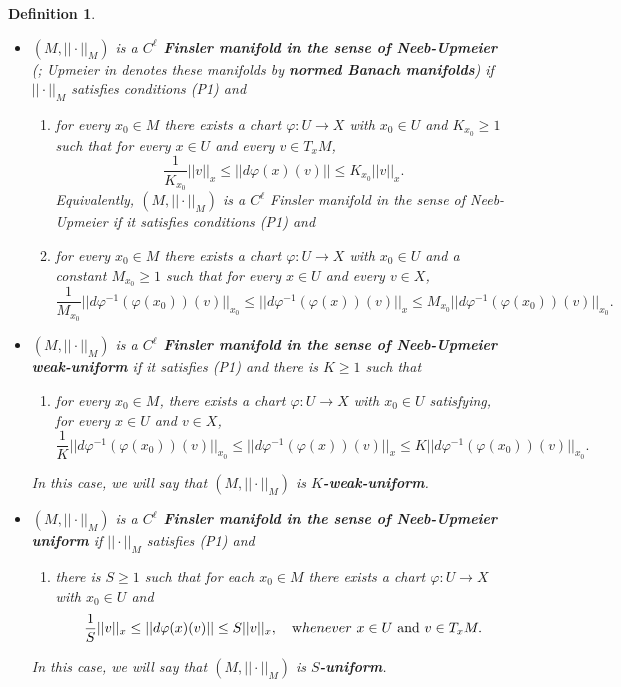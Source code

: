 \documentclass[11pt]{amsart}
\newtheorem{defn}[thm]{Definition}
\numberwithin{equation}{section}
\begin{document}
\begin{defn}
\begin{itemize}
\item[{\bf (F2)}]  $(M,||\cdot||_M)$ is a \textbf{$C^\ell$ Finsler manifold in the sense of Neeb-Upmeier} (\cite{Neeb}; Upmeier in \cite{Upmeier} denotes these manifolds by  {\bf {\em normed Banach manifolds}}) if $||\cdot||_M$  satisfies   conditions {\em (P1)} and
\begin{enumerate}
\item[(NU1)] for every $x_0\in M$ there exists a chart $\varphi:U\to X$ with $x_0\in U$ and $K_{x_0}\ge 1$ such that for every $x\in U$ and every $v\in T_x M$,
\begin{equation}\label{ineq-Neeb-Upmeier}
\frac{1}{K_{x_0}}||v||_x\le ||d\varphi(x)(v)||\le K_{x_0}||v||_x.
\end{equation}
 Equivalently,  $(M,||\cdot||_M)$ is a $C^\ell$ Finsler manifold in the sense of Neeb-Upmeier if it satisfies conditions {\em (P1)} and
\item[(NU2)]  for every $x_0\in M$ there exists a  chart $\varphi:U\to X$ with $x_0\in U$
and a constant $M_{x_0}\ge 1$ such that for every $x\in U$ and every $v\in X$,
 \begin{equation*}
\frac{1}{M_{x_0}}||d\varphi^{-1}(\varphi(x_0))(v)||_{x_0}\le ||d\varphi^{-1}(\varphi(x))(v)||_{x}\le M_{x_0}||d\varphi^{-1}(\varphi(x_0))(v)||_{x_0}.
\end{equation*}
\end{enumerate}

\item[{\bf (F3)}] $(M,||\cdot||_M)$   is a \textbf{ $C^\ell$ Finsler manifold  in the sense of  Neeb-Upmeier   weak-uniform} if it satisfies {\em (P1)} and there is $K\ge 1$ such that
\begin{enumerate}
\item[(NU3)]  for every $x_0\in M$, there exists a chart $\varphi:U\to X$ with $x_0\in U$ satisfying, for every $x\in U$ and $v\in  X$,
\begin{equation} \label{ineq-K-weak-uniform}
\frac{1}{K}||d\varphi^{-1}(\varphi(x_0))(v)||_{x_0}\le ||d\varphi^{-1}(\varphi(x))(v)||_{x}\le K||d\varphi^{-1}(\varphi(x_0))(v)||_{x_0}.
\end{equation}
\end{enumerate}
In this case, we will say that $(M,|| \cdot ||_M)$ is \textbf{ $K$-weak-uniform}.

\item[{\bf (F4)}]  $(M,||\cdot||_M)$ is a  \textbf{ $C^\ell$ Finsler manifold in the sense of  Neeb-Upmeier uniform} if $||\cdot||_M$  satisfies {\em (P1)} and
\begin{enumerate}
\item[(NU4)] there is $S\ge 1$ such that for each $x_0\in M$ there exists a chart $\varphi:U\to X$ with $x_0\in U$ and
\begin{equation}\label{ineq-S-uniform}
\frac{1}{S}||v||_x\le ||d\varphi(x)(v)||\le S||v||_x, \quad {\text whenever \ } x\in U
\text{ and } v\in T_x M.
\end{equation}
\end{enumerate}
In this case, we will say that $(M,|| \cdot ||_M)$ is  \textbf{ $S$-uniform}.
\end{itemize}
\end{defn}
\end{document}
